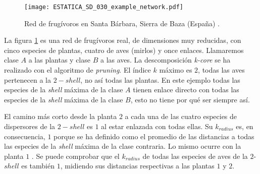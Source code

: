 
\begin{figure}[h!]
\centering
\texttt{[image: ESTATICA\_SD\_030\_example\_network.pdf]}
\caption {Red de frugívoros en Santa Bárbara, Sierra de Baza (España) \cite{jordano1993geographical}.}
\label{fig:ESTATICA_red_example}
\end{figure}

%

La figura \ref{fig:ESTATICA_red_example} es una red de frugívoros real, de dimensiones muy reducidas, con cinco especies de plantas, cuatro de aves (mirlos) y once enlaces. Llamaremos clase $A$ a las plantas y clase $B$ a las aves. La descomposición \textit{k-core} se ha realizado con el algoritmo de \textit{pruning}. El índice $k$ máximo es $2$, todas las aves pertenecen a la $2-shell$, no así todas las plantas. En este ejemplo todas las especies de la \textit{shell} máxima de la clase $A$ tienen enlace directo con todas las especies de la \textit{shell} máxima de la clase $B$, esto no tiene por qué ser siempre así. 

El camino más corto desde la planta $2$ a cada una de las cuatro especies de dispersores de la $2-shell$ es $1$ al estar enlazada con todas ellas. Su $k_{radius}$ es, en consecuencia, $1$ porque se ha definido como el promedio de las distancias a todas las especies de la \textit{shell} máxima de la clase contraria. Lo mismo ocurre con la planta $1$ . Se puede comprobar que el $k_{radius}$ de todas las especies de aves de la $2$-$shell$ es también $1$, midiendo sus distancias respectivas a las plantas $1$ y $2$.

